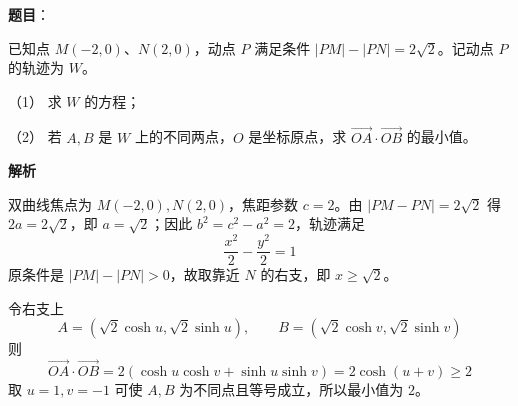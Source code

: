 \begin{answer}

\textbf{题目}：

已知点 $M(-2,0)$、$N(2,0)$，动点 $P$ 满足条件 $|PM|-|PN|=2\sqrt2$。记动点 $P$ 的轨迹为 $W$。

（1） 求 $W$ 的方程；

（2） 若 $A,B$ 是 $W$ 上的不同两点，$O$ 是坐标原点，求 $\overrightarrow{OA}\cdot\overrightarrow{OB}$ 的最小值。

\textbf{解析}


双曲线焦点为 $M(-2,0),N(2,0)$，焦距参数 $c=2$。由 $|PM-PN|=2\sqrt2$ 得 $2a=2\sqrt2$，即 $a=\sqrt2$；因此 $b^2=c^2-a^2=2$，轨迹满足
\nopagebreak[4]
\[
\frac{x^2}{2}-\frac{y^2}{2}=1
\]
原条件是 $|PM|-|PN|>0$，故取靠近 $N$ 的右支，即 $x\ge\sqrt2$。


令右支上
\nopagebreak[4]
\[
A=(\sqrt2\cosh u,\sqrt2\sinh u),\qquad
B=(\sqrt2\cosh v,\sqrt2\sinh v)
\]
则
\nopagebreak[4]
\[
\overrightarrow{OA}\cdot\overrightarrow{OB}
=2(\cosh u\cosh v+\sinh u\sinh v)
=2\cosh(u+v)\ge2
\]
取 $u=1,v=-1$ 可使 $A,B$ 为不同点且等号成立，所以最小值为 $2$。



\end{answer}
